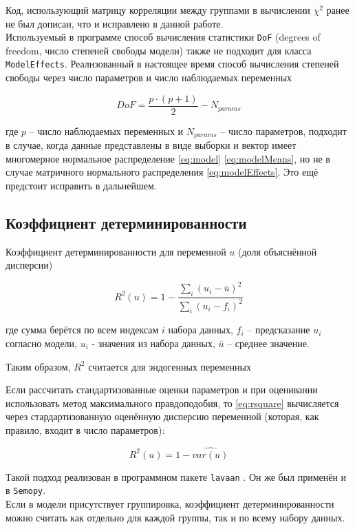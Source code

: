 Код, использующий  матрицу корреляции между группами в вычислении $ \chi^2 $ ранее не был дописан, что и исправлено в данной работе. \\

Используемый в программе способ вычисления статистики \texttt{DoF} (degrees of freedom, число степеней свободы модели) также не подходит для класса \texttt{Model\-Effects}.
Реализованный в настоящее время способ вычисления степеней свободы через число параметров и число наблюдаемых переменных

\[ DoF = \frac{p \cdot (p + 1)}{2} - N_{params} \]

где $ p $ -- число наблюдаемых переменных и $ N_{params} $ -- число параметров, подходит в случае, когда данные представлены в виде выборки и вектор имеет многомерное нормальное распределение \eqref{eq:model} \eqref{eq:modelMeans}, но не в случае матричного нормального распределения \eqref{eq:modelEffects}.
Это ещё предстоит исправить в дальнейшем.

\subsection{Коэффициент детерминированности}

Коэффициент детерминированности для переменной $ u $ (доля объяснённой дисперсии)

\begin{equation}\label{eq:rsquare}
	R^2(u) = 1 - \frac{\sum _i (u_i - \bar u)^2}{ \sum_i (u_i - f_i)^2 }
\end{equation}

где сумма берётся по всем индексам $ i $ набора данных, $ f_i $ -- предсказание $ u_i $ согласно модели, $ u_i $ - значения из набора данных, $ \bar u $ -- среднее значение.

Таким образом, $ R^2 $ считается для эндогенных переменных

Если рассчитать стандартизованные оценки параметров и при оценивании использовать метод максимального правдоподобия, то \eqref{eq:rsquare}  вычисляется через стардартизованную оценённую дисперсию переменной (которая, как правило, входит в число параметров):

\begin{equation}\label{eq:r2Simplified}
	R^2(u) = 1 -  \widehat{var(u)}
\end{equation}

Такой подход реализован в программном пакете \texttt{lavaan} \cite{lavaan2012}. 
Он же был применён и в \texttt{Semopy}. \\

Если в модели присутствует группировка, коэффициент детерминированности можно считать как отдельно для каждой группы, так и по всему набору данных.
